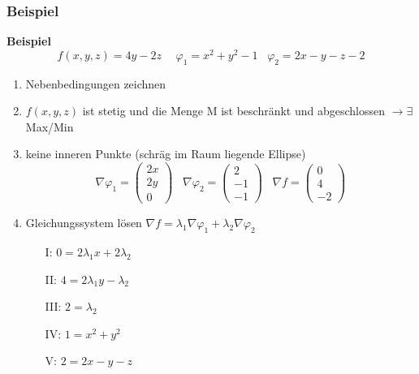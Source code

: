 \documentclass[a3paper, 11pt, landscape]{scrartcl}
\begin{document}
\begin{multicols*}{3}
					\subsubsection{Beispiel}
				    	\textbf{Beispiel}
						\begin{equation*}
							f(x, y, z)=4y-2z \hspace{15pt} \varphi_1=x^2+y^2-1 \hspace{10pt} \varphi_2=2x-y-z-2
						\end{equation*}
						\begin{enumerate}
							\item Nebenbedingungen zeichnen
							\item $f(x, y, z)$ ist stetig und die Menge M ist beschränkt und abgeschlossen $\rightarrow \exists$ Max/Min
							\item keine inneren Punkte (schräg im Raum liegende Ellipse)
							\begin{equation*}
								\nabla \varphi_1=
								\begin{pmatrix}
									2x\\ 2y\\ 0
								\end{pmatrix}
								\hspace{10pt} \nabla \varphi_2=
								\begin{pmatrix}
									2\\ -1\\-1
								\end{pmatrix}
								\hspace{10pt} \nabla f=
								\begin{pmatrix}
									0\\ 4\\ -2
								\end{pmatrix}
							\end{equation*}
							\item Gleichungssystem lösen \hspace{10pt} $\nabla f=\lambda_1 \nabla \varphi_1+\lambda_2 \nabla \varphi_2$
							\begin{multicols*}{2}
								\begin{itemize}
									\item[I: ] $0 =2 \lambda_1 x+2 \lambda_2$
									\item[II: ] $4=2 \lambda_1 y-\lambda_2$
									\item[III: ] $2=\lambda_2$
									\item[IV: ] $1=x^2+y^2$
									\item[V: ] $2=2x-y-z$

\end{itemize}
\end{multicols*}
\end{enumerate}
\end{multicols*}
\end{document}
